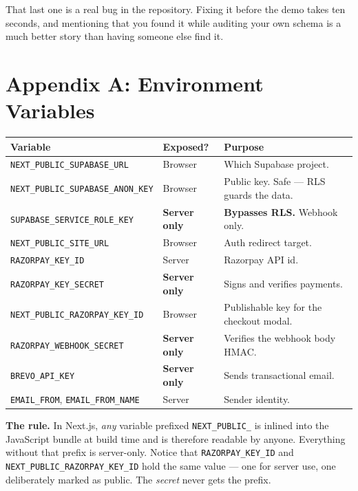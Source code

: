 \documentclass[11pt,a4paper]{article}
\begin{document}
\begin{notebox}
That last one is a real bug in the repository. Fixing it before the demo takes ten
seconds, and mentioning that you found it while auditing your own schema is a much
better story than having someone else find it.
\end{notebox}

\newpage
\section{Appendix A: Environment Variables}

\begin{longtable}{@{}p{6.2cm}p{2.0cm}p{6.4cm}@{}}
\toprule
\textbf{Variable} & \textbf{Exposed?} & \textbf{Purpose} \\
\midrule
\endhead
\texttt{NEXT\_PUBLIC\_SUPABASE\_URL} & Browser & Which Supabase project. \\
\texttt{NEXT\_PUBLIC\_SUPABASE\_ANON\_KEY} & Browser & Public key. Safe --- RLS
guards the data. \\
\texttt{SUPABASE\_SERVICE\_ROLE\_KEY} & \textbf{Server only} &
\textbf{Bypasses RLS.} Webhook only. \\
\texttt{NEXT\_PUBLIC\_SITE\_URL} & Browser & Auth redirect target. \\
\texttt{RAZORPAY\_KEY\_ID} & Server & Razorpay API id. \\
\texttt{RAZORPAY\_KEY\_SECRET} & \textbf{Server only} & Signs and verifies
payments. \\
\texttt{NEXT\_PUBLIC\_RAZORPAY\_KEY\_ID} & Browser & Publishable key for the
checkout modal. \\
\texttt{RAZORPAY\_WEBHOOK\_SECRET} & \textbf{Server only} & Verifies the webhook
body HMAC. \\
\texttt{BREVO\_API\_KEY} & \textbf{Server only} & Sends transactional email. \\
\texttt{EMAIL\_FROM}, \texttt{EMAIL\_FROM\_NAME} & Server & Sender identity. \\
\bottomrule
\end{longtable}

\begin{warnbox}
\textbf{The rule.} In Next.js, \emph{any} variable prefixed
\texttt{NEXT\_PUBLIC\_} is inlined into the JavaScript bundle at build time and is
therefore readable by anyone. Everything without that prefix is server-only. Notice
that \texttt{RAZORPAY\_KEY\_ID} and \texttt{NEXT\_PUBLIC\_RAZORPAY\_KEY\_ID} hold
the same value --- one for server use, one deliberately marked as public. The
\emph{secret} never gets the prefix.
\end{warnbox}
\end{document}

